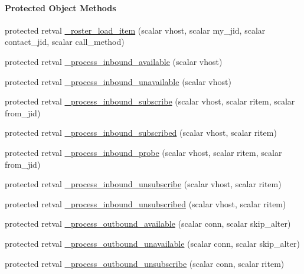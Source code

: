 \begin{Indent}\paragraph*{\-Protected \-Object \-Methods}
\begin{DoxyCompactItemize}
\item 
protected retval \hyperlink{class_d_jabberd_1_1_presence_aa67428c2e5157b840fd5343e528bdbbc}{\-\_\-roster\-\_\-load\-\_\-item} (scalar vhost, scalar my\-\_\-jid, scalar contact\-\_\-jid, scalar call\-\_\-method)
\item 
protected retval \hyperlink{class_d_jabberd_1_1_presence_a22d1ef0a856645fd6f6fe52324a3600b}{\-\_\-process\-\_\-inbound\-\_\-available} (scalar vhost)
\item 
protected retval \hyperlink{class_d_jabberd_1_1_presence_abd89432e272646733a86be984fb21a97}{\-\_\-process\-\_\-inbound\-\_\-unavailable} (scalar vhost)
\item 
protected retval \hyperlink{class_d_jabberd_1_1_presence_a6facfb84e679eea5cf0da370b722c6a3}{\-\_\-process\-\_\-inbound\-\_\-subscribe} (scalar vhost, scalar ritem, scalar from\-\_\-jid)
\item 
protected retval \hyperlink{class_d_jabberd_1_1_presence_abbbdce5e94e1addaf8171f3589793f79}{\-\_\-process\-\_\-inbound\-\_\-subscribed} (scalar vhost, scalar ritem)
\item 
protected retval \hyperlink{class_d_jabberd_1_1_presence_ac20583d8d49b3aa01680df16fb9e5fb1}{\-\_\-process\-\_\-inbound\-\_\-probe} (scalar vhost, scalar ritem, scalar from\-\_\-jid)
\item 
protected retval \hyperlink{class_d_jabberd_1_1_presence_a2c7180ab75b8fa6cdc39112816977051}{\-\_\-process\-\_\-inbound\-\_\-unsubscribe} (scalar vhost, scalar ritem)
\item 
protected retval \hyperlink{class_d_jabberd_1_1_presence_a5d675fc09a7028a04a41d64888d94ec9}{\-\_\-process\-\_\-inbound\-\_\-unsubscribed} (scalar vhost, scalar ritem)
\item 
protected retval \hyperlink{class_d_jabberd_1_1_presence_ab07352a351b387bd8042233e6391f3fd}{\-\_\-process\-\_\-outbound\-\_\-available} (scalar conn, scalar skip\-\_\-alter)
\item 
protected retval \hyperlink{class_d_jabberd_1_1_presence_ab1f0a0475410d4b221ff90ec2c5b591a}{\-\_\-process\-\_\-outbound\-\_\-unavailable} (scalar conn, scalar skip\-\_\-alter)
\item 
protected retval \hyperlink{class_d_jabberd_1_1_presence_a09f691e7bcb1a07748abf816ffbe1eff}{\-\_\-process\-\_\-outbound\-\_\-unsubscribe} (scalar conn, scalar ritem)

\end{DoxyCompactItemize}
\end{Indent}
